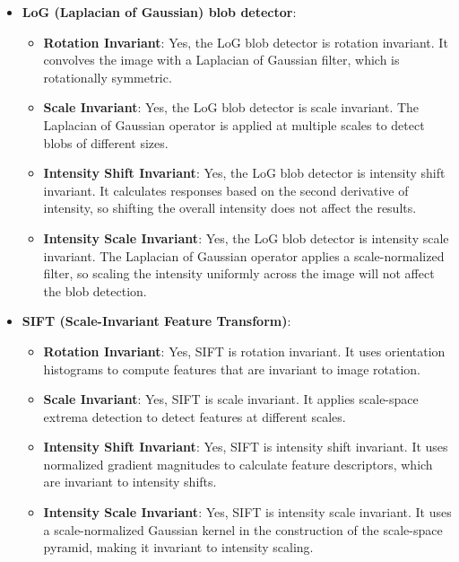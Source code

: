 \documentclass{article}
\begin{document}
\begin{itemize}
    \item \textbf{LoG (Laplacian of Gaussian) blob detector}:
    \begin{itemize}
        \item \textbf{Rotation Invariant}: Yes, the LoG blob detector is rotation invariant. It convolves the image with a Laplacian of Gaussian filter, which is rotationally symmetric.
        \item \textbf{Scale Invariant}: Yes, the LoG blob detector is scale invariant. The Laplacian of Gaussian operator is applied at multiple scales to detect blobs of different sizes.
        \item \textbf{Intensity Shift Invariant}: Yes, the LoG blob detector is intensity shift invariant. It calculates responses based on the second derivative of intensity, so shifting the overall intensity does not affect the results.
        \item \textbf{Intensity Scale Invariant}: Yes, the LoG blob detector is intensity scale invariant. The Laplacian of Gaussian operator applies a scale-normalized filter, so scaling the intensity uniformly across the image will not affect the blob detection.
    \end{itemize}

    \item \textbf{SIFT (Scale-Invariant Feature Transform)}:
    \begin{itemize}
        \item \textbf{Rotation Invariant}: Yes, SIFT is rotation invariant. It uses orientation histograms to compute features that are invariant to image rotation.
        \item \textbf{Scale Invariant}: Yes, SIFT is scale invariant. It applies scale-space extrema detection to detect features at different scales.
        \item \textbf{Intensity Shift Invariant}: Yes, SIFT is intensity shift invariant. It uses normalized gradient magnitudes to calculate feature descriptors, which are invariant to intensity shifts.
        \item \textbf{Intensity Scale Invariant}: Yes, SIFT is intensity scale invariant. It uses a scale-normalized Gaussian kernel in the construction of the scale-space pyramid, making it invariant to intensity scaling.
    \end{itemize}

\end{itemize}

\newpage
\end{document}
